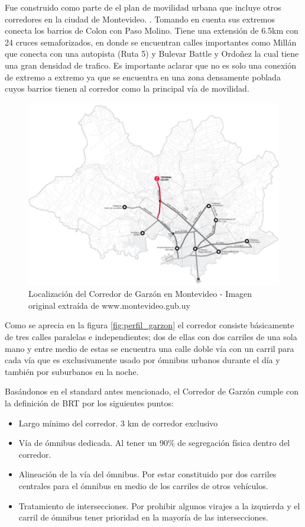 Fue construido como parte de el plan de movilidad urbana que incluye otros corredores en la ciudad de Montevideo. \citep{PlanMovilidad}. Tomando en cuenta sus extremos conecta los barrios de Colon con Paso Molino. Tiene una extensión de 6.5km con 24 cruces semaforizados, en donde se encuentran calles importantes como Millán que conecta con una autopista (Ruta 5) y Bulevar Battle y Ordoñez la cual tiene una gran densidad de trafico. Es importante aclarar que no es solo una conexión de extremo a extremo ya que se encuentra en una zona densamente poblada cuyos barrios tienen al corredor como la principal vía de movilidad.

\begin{figure}[H]
	\centering
	\includegraphics[width=0.7\linewidth]{Figures/Mapa_Garzon_0}
	\caption{Localización del Corredor de Garzón en Montevideo - Imagen original extraída de www.montevideo.gub.uy		
	}
	\label{fig:Grafica de costos de otros medios de transporte}
\end{figure}

Como se aprecia en la figura \ref{fig:perfil_garzon} el corredor consiste básicamente de tres calles paralelas e independientes; dos de ellas con dos carriles de una sola mano y entre medio de estas se encuentra una calle doble vía con un carril para cada vía que es exclusivamente usado por ómnibus urbanos durante el día y también por suburbanos en la noche.


Basándonos en el standard antes mencionado, el Corredor de Garzón cumple con la definición de BRT por los siguientes puntos:
\begin{itemize}
	\item Largo mínimo del corredor. 3 km de corredor exclusivo 
	\item Vía de ómnibus dedicada. Al tener un 90\% de segregación física dentro del corredor.
	\item Alineación de la vía del ómnibus. Por estar constituido por dos carriles centrales para el ómnibus en medio de los carriles de otros vehículos.
	\item Tratamiento de intersecciones. Por prohibir algunos virajes a la izquierda y el carril de ómnibus tener prioridad en la mayoría de las intersecciones.
\end{itemize}


